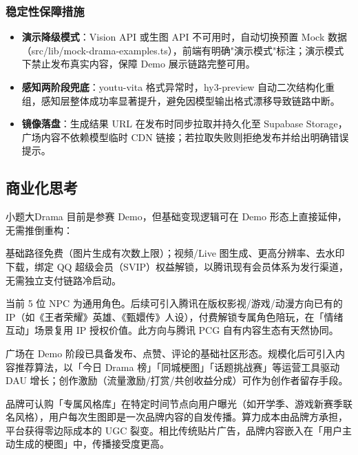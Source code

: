 \documentclass[10pt, a4paper]{article}
\newcommand{\kw}[1]{\textbf{#1}}
\newcommand{\code}[1]{{\small\ttfamily #1}}
\newcommand{\model}[1]{{\small\ttfamily\color{TokenPurple}#1}}
\begin{document}
\subsubsection*{稳定性保障措施}

\begin{itemize}[leftmargin=2em, itemsep=0.25em, topsep=3pt]
  \item \kw{演示降级模式}：Vision API 或生图 API 不可用时，自动切换预置 Mock 数据（\code{src/lib/mock-drama-examples.ts}），前端有明确"演示模式"标注；演示模式下禁止发布真实内容，保障 Demo 展示链路完整可用。
  \item \kw{感知两阶段兜底}：\model{youtu-vita} 格式异常时，\model{hy3-preview} 自动二次结构化重组，感知层整体成功率显著提升，避免因模型输出格式漂移导致链路中断。
  \item \kw{镜像落盘}：生成结果 URL 在发布时同步拉取并持久化至 Supabase Storage，广场内容不依赖模型临时 CDN 链接；若拉取失败则拒绝发布并给出明确错误提示。
\end{itemize}

\subsection{商业化思考}

小题大Drama 目前是参赛 Demo，但基础变现逻辑可在 Demo 形态上直接延伸，无需推倒重构：

\vspace{3pt}
\begin{description}[leftmargin=0em, style=nextline, itemsep=0.6em, topsep=3pt]

  \item[\kw{免费 + 会员增值（C 端主线）}]
    基础路径免费（图片生成有次数上限）；视频/Live 图生成、更高分辨率、去水印下载，绑定 QQ 超级会员（SVIP）权益解锁，以腾讯现有会员体系为发行渠道，无需独立支付链路冷启动。

  \item[\kw{情绪 IP 角色（社交付费延伸）}]
    当前 5 位 NPC 为通用角色。后续可引入腾讯在版权影视/游戏/动漫方向已有的 IP（如《王者荣耀》英雄、《甄嬛传》人设），付费解锁专属角色陪玩，在「情绪互动」场景复用 IP 授权价值。此方向与腾讯 PCG 自有内容生态有天然协同。

  \item[\kw{UGC 内容广场的社区运营}]
    广场在 Demo 阶段已具备发布、点赞、评论的基础社区形态。规模化后可引入内容推荐算法，以「今日 Drama 榜」「同城梗图」「话题挑战赛」等运营工具驱动 DAU 增长；创作激励（流量激励/打赏/共创收益分成）可作为创作者留存手段。

  \item[\kw{品牌 \& 营销场景（ToB）}]
    品牌可认购「专属风格库」在特定时间节点向用户曝光（如开学季、游戏新赛季联名风格），用户每次生图即是一次品牌内容的自发传播。算力成本由品牌方承担，平台获得零边际成本的 UGC 裂变。相比传统贴片广告，品牌内容嵌入在「用户主动生成的梗图」中，传播接受度更高。

\end{description}
\end{document}
